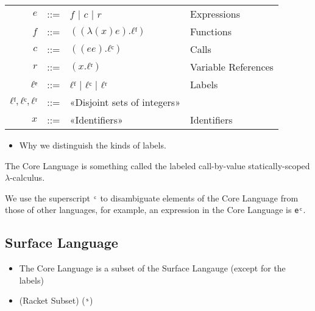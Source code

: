 \documentclass[12pt, oneside]{book}
\begin{document}
\begin{tabular}{rcll}
           \(e\) & ::= & \(f\) | \(c\) | \(r\)       & Expressions         \\
           \(f\) & ::= & \(((λ (x) e) . ℓᶠ)\)        & Functions           \\
           \(c\) & ::= & \(((e e) . ℓᶜ)\)            & Calls               \\
           \(r\) & ::= & \((x . ℓʳ)\)                & Variable References \\
          \(ℓᵉ\) & ::= & \(ℓᶠ\) | \(ℓᶜ\) | \(ℓʳ\)    & Labels              \\
  \(ℓᶠ, ℓᶜ, ℓʳ\) & ::= & «Disjoint sets of integers» &                     \\
          \(x\)  & ::= & «Identifiers»               & Identifiers         \\
\end{tabular}

\begin{itemize}
  \item Why we distinguish the kinds of labels.
\end{itemize}

The Core Language is something called the labeled call-by-value statically-scoped \(λ\)-calculus.

We use the superscript \texttt{ᶜ} to disambiguate elements of the Core Language from those of other languages, for example, an expression in the Core Language is \texttt{eᶜ}.

\subsection{Surface Language}
\label{section:surface-language}

\begin{itemize}
  \item The Core Language is a subset of the Surface Langauge (except for the labels)
  \item  (Racket Subset) (\texttt{ˢ})
\end{itemize}
\end{document}

